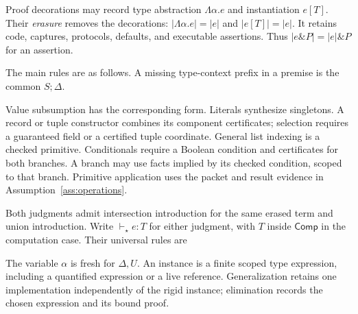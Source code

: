 \documentclass[10pt,a4paper]{article}
\newcommand{\supp}{\operatorname{supp}}
\newcommand{\Comp}{\mathsf{Comp}}
\newcommand{\Fail}{\mathsf{fail}}
\newcommand{\Type}{\mathsf{Type}}
\newcommand{\erase}[1]{\lvert #1\rvert}
\newcommand{\jud}{S;\Delta;\Gamma}
\theoremstyle{remark}
\begin{document}
Proof decorations may record type abstraction $\Lambda\alpha.e$ and
instantiation $e[T]$. Their \emph{erasure} removes the decorations:
$\erase{\Lambda\alpha.e}=\erase e$ and $\erase{e[T]}=\erase e$.
It retains code, captures, protocols, defaults, and executable assertions.
Thus $\erase{e\mathbin{\&}P}=\erase e\mathbin{\&}P$ for an assertion.

The main rules are as follows. A missing type-context prefix in a premise is
the common $S;\Delta$.
Value subsumption has the corresponding form. Literals synthesize singletons.
A record or tuple constructor combines its component certificates; selection
requires a guaranteed field or a certified tuple coordinate. General list
indexing is a checked primitive. Conditionals require a Boolean condition and
certificates for both branches. A branch may use facts implied by its checked
condition, scoped to that branch. Primitive application uses the packet and
result evidence in Assumption~\ref{ass:operations}.

Both judgments admit intersection introduction for the same erased term and
union introduction. Write $\vdash_\star e:T$ for either judgment, with $T$
inside $\Comp$ in the computation case. Their universal rules are
The variable $\alpha$ is fresh for $\Delta,U$. An instance is a finite scoped
type expression, including a quantified expression or a live reference.
Generalization retains one implementation independently of the rigid instance;
elimination records the chosen expression and its bound proof.
\end{document}
